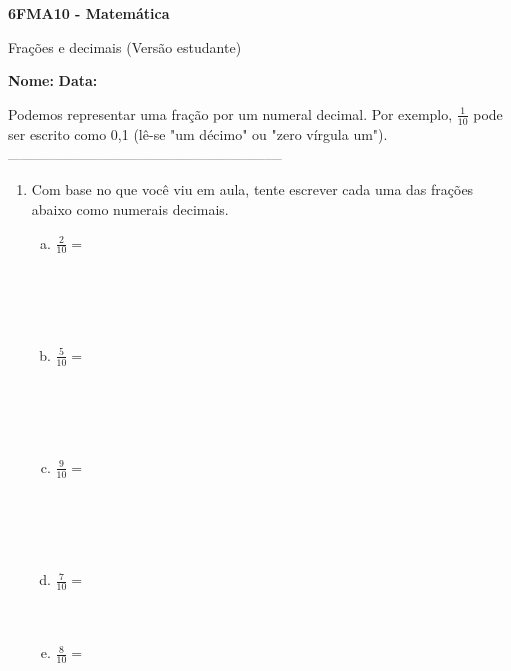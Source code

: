 \documentclass[a4paper,14pt]{article}
\begin{document}
	
	\noindent\textbf{6FMA10 - Matemática} 
	
	\begin{center}Frações e decimais (Versão estudante)
	\end{center}
	
	\noindent\textbf{Nome:} \underline{\hspace{10cm}}
	\noindent\textbf{Data:} \underline{\hspace{4cm}}
	
	
	\begin{multicols}{2}
		\noindent Podemos representar uma fração por um numeral decimal. Por exemplo, $\frac{1}{10}$ pode ser escrito como 0,1 (lê-se "um décimo" ou "zero vírgula um"). \\
		\noindent\textsubscript{-----------------------------------------------------------------------}
		\begin{enumerate} 
			\item Com base no que você viu em aula, tente escrever cada uma das frações abaixo como numerais decimais.
			\begin{enumerate}[a)]
				\item $\frac{2}{10} = $ \\\\\\\\\\
				\item $\frac{5}{10} = $ \\\\\\\\\\
				\item $\frac{9}{10} = $ \\\\\\\\\\
				\item $\frac{7}{10} = $ \\\\\\
				\item $\frac{8}{10} = $ \\\\\\\\\\

\end{enumerate}
\end{enumerate}
\end{multicols}
\end{document}
